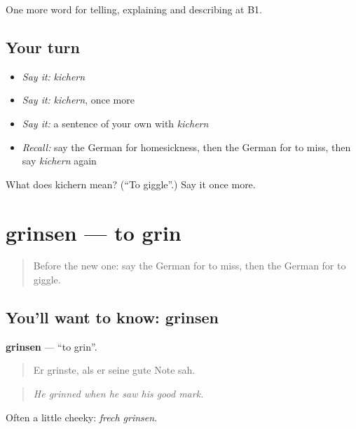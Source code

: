 \begin{grammarlens}[title={What you've built}]
One more word for telling, explaining and describing at B1.
\end{grammarlens}

\subsection*{Your turn}
\begin{itemize}
\raggedright
  \item \emph{Say it:} \emph{kichern}
  \item \emph{Say it:} \emph{kichern}, once more
  \item \emph{Say it:} a sentence of your own with \emph{kichern}
  \item \emph{Recall:} say the German for homesickness, then the German for to miss, then say \emph{kichern} again
\end{itemize}

\begin{tcolorbox}[breakable,colback=teal!4,colframe=teal!35!black,title={Before you move on}]
What does kichern mean? (\textquotedblleft{}To giggle\textquotedblright{}.) Say it once more.
\end{tcolorbox}
\section[grinsen]{grinsen — to grin}

\label{lesson:GE-C473-grinsen}



\begin{quote}
Before the new one: say the German for to miss, then the German for to giggle.
\end{quote}

\subsection*{You'll want to know: grinsen}
\textbf{grinsen} — \textquotedblleft{}to grin\textquotedblright{}.

\begin{quote}
Er grinste, als er seine gute Note sah.
\end{quote}

\begin{quote}
\emph{He grinned when he saw his good mark.}
\end{quote}

Often a little cheeky: \emph{frech grinsen}.

